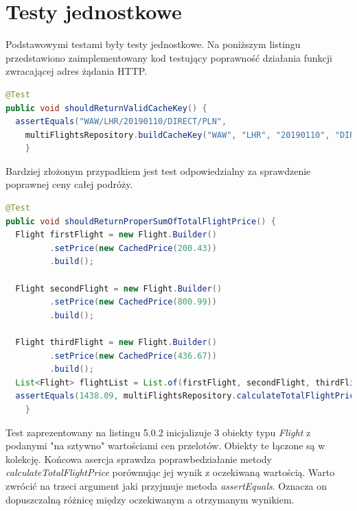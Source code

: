 \documentclass[12pt, twoside]{report}
\begin{document}
\section{Testy jednostkowe}
Podstawowymi testami były testy jednostkowe. Na poniższym listingu przedstawiono zaimplementowany kod testujący poprawność działania funkcji zwracającej adres żądania HTTP.
\begin{lstlisting}[language=java, caption=Przykładowy test jednostkowy]
@Test
public void shouldReturnValidCacheKey() {
  assertEquals("WAW/LHR/20190110/DIRECT/PLN",
    multiFlightsRepository.buildCacheKey("WAW", "LHR", "20190110", "DIRECT", "PLN"));
    }
\end{lstlisting}
Bardziej złożonym przypadkiem jest test odpowiedzialny za sprawdzenie poprawnej ceny całej podróży.
\begin{lstlisting}[language=java, caption=Przykładowy test jednostkowy]
@Test
public void shouldReturnProperSumOfTotalFlightPrice() {
  Flight firstFlight = new Flight.Builder()
         .setPrice(new CachedPrice(200.43))
         .build();
 
  Flight secondFlight = new Flight.Builder()
         .setPrice(new CachedPrice(800.99))
         .build();

  Flight thirdFlight = new Flight.Builder()
         .setPrice(new CachedPrice(436.67))
         .build();
  List<Flight> flightList = List.of(firstFlight, secondFlight, thirdFlight);
  assertEquals(1438.09, multiFlightsRepository.calculateTotalFlightPrice(flightList), 0.001);
    }
\end{lstlisting}
Test zaprezentowany na listingu 5.0.2 inicjalizuje 3 obiekty typu \textit{Flight} z podanymi "na sztywno" wartościami cen przelotów. Obiekty te łączone są w kolekcję. Końcowa asercja sprawdza poprawbedziałanie metody \textit{calculateTotalFlightPrice} porównując jej wynik z oczekiwaną wartością. Warto zwrócić na trzeci argument jaki przyjmuje metoda \textit{assertEquals}. Oznacza on dopuszczalną różnicę między oczekiwanym a otrzymanym wynikiem.
\newpage
\end{document}
